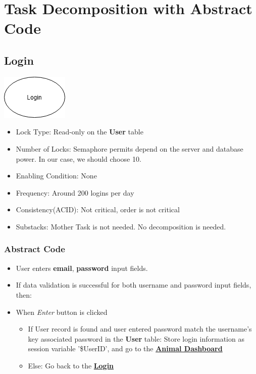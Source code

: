 \documentclass[a4paper]{article}
\begin{document}
\pagebreak
\section{Task Decomposition with Abstract Code}

\hypertarget{login}{\subsection{Login}}
\includegraphics[scale = 0.6]{login.png}

\begin{itemize}
	\item Lock Type: Read-only on the \textbf{User} table
	\item Number of Locks: Semaphore permits depend on the server and database power. In our case, we should choose 10.
	\item Enabling Condition: None
	\item Frequency: Around 200 logins per day
	\item Consistency(ACID): Not critical, order is not critical
	\item Substacks: Mother Task is not needed. No decomposition is needed.
\end{itemize}

\subsubsection*{Abstract Code}

\begin{itemize}
        \item User enters \textbf{email}, \textbf{password} input fields.
        \item If data validation is successful for both username and password input fields, then:

\item When \textit{Enter} button is clicked \begin{itemize}
        \item If User record is found and user entered password match the username's key associated password in the \textbf{User} table: Store login information as session variable '\$UserID', and go to the \underline{\textbf{Animal Dashboard}}
	\item Else: Go back to the \underline{\textbf{Login}}
	\end{itemize}
\end{itemize}
\end{document}
